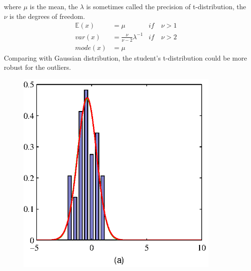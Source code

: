 \documentclass[12pt, a4paper]{article}
\newcommand{\E}{\mathbb{E}}
\begin{document}
\begin{itemize}
        where $\mu$ is the mean, the $\lambda$ is sometimes called the precision of t-distribution, 
        the $\nu$ is the degrees of freedom.
        \begin{align*}
            \E (x)&=\mu &if\quad\nu>1\\
            var (x)&=\frac{\nu}{\nu-2}\lambda^{-1} &if\quad\nu>2\\
            mode (x)&=\mu&
        \end{align*}
        Comparing with Gaussian distribution, the student's t-distribution could be more robust for 
        the outliers.
        \begin{figure}[htbp]
            \begin{minipage}[t]{0.45\textwidth}
                \centering
                \includegraphics[width=0.9\textwidth]{figures/Figure2_16a.eps}
            \end{minipage}
            \hfill
            \begin{minipage}[t]{0.45\textwidth}
                \centering

\end{minipage}
\end{figure}
\end{itemize}
\end{document}
